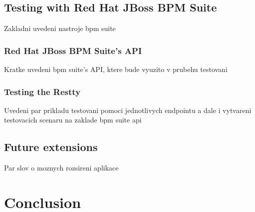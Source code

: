 \section{Testing with Red Hat JBoss BPM Suite}
Zakladni uvedeni nastroje bpm suite

\subsection{Red Hat JBoss BPM Suite's API}
Kratke uvedeni bpm suite's API, ktere bude vyuzito v prubehu testovani

\subsection{Testing the Restty}
Uvedeni par prikladu testovani pomoci jednotlivych endpointu a dale i vytvareni testovacich scenaru
na zaklade bpm suite api

\section{Future extensions}
Par slov o moznych rozsireni aplikace


\chapter{Conclusion}






